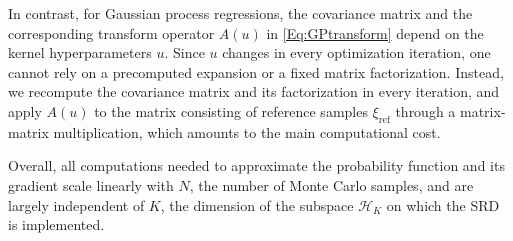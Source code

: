 \documentclass[%
onefignum,onetabnum]{siamonline250211}
\begin{document}
In contrast, for Gaussian process regressions, the covariance matrix and the corresponding transform operator $A(u)$ in \eqref{Eq:GPtransform} depend on the kernel hyperparameters $u$. Since $u$ changes in every optimization iteration, one cannot rely on a precomputed expansion or a fixed matrix factorization. Instead, we recompute the covariance matrix and its factorization in every iteration, and apply $A(u)$ to the matrix consisting of reference samples $\xi_{\mathrm{ref}}$ through a matrix-matrix multiplication, which amounts to the main computational cost.

Overall, all computations needed to approximate the probability function and its gradient scale linearly with $N$, the number of Monte Carlo samples, and are largely independent of $K$, the dimension of the subspace $\mathscr H_K$ on which the SRD is implemented.





\end{document}
